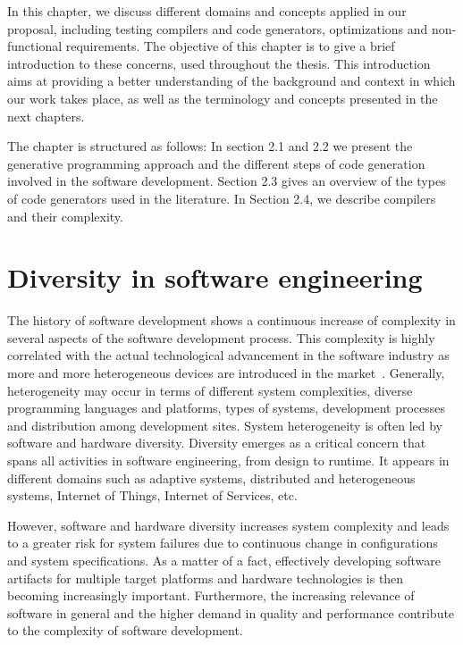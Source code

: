  
In this chapter, we discuss different domains and concepts applied in our proposal, including testing compilers and code generators, optimizations and non-functional requirements.
The objective of this chapter is to give a brief introduction to these concerns, used throughout the thesis. This introduction aims at providing a better understanding of the background and context in which our work takes place, as well as the terminology and concepts presented in the next chapters.

The chapter is structured as follows: In section 2.1 and 2.2 we present the generative programming approach and the different steps of code generation involved in the software development. Section 2.3 gives an overview of the types of code generators used in the literature. In Section 2.4, we describe compilers and their complexity.


\section{Diversity in software engineering}
The history of software development shows a continuous increase of complexity in several aspects of the software development process. This complexity is highly correlated with the actual technological advancement in the software industry as more and more heterogeneous devices are introduced in the market~\cite{betz2011improving}. 
Generally, heterogeneity may occur in terms of different system complexities, diverse programming languages and platforms, types of systems, development processes and distribution among development sites\cite{ghazi2015heterogeneous}.
System heterogeneity is often led by software and hardware diversity.
Diversity emerges as a critical concern that spans all activities in software engineering, from design to runtime\cite{acher2014software}. It appears in different domains such as adaptive systems, distributed and heterogeneous systems, Internet of Things, Internet of Services, etc.

However, software and hardware diversity increases system complexity and leads to a greater risk for system failures due to continuous change in configurations and system specifications.
As a matter of a fact, effectively developing software artifacts for multiple target platforms and hardware technologies is then becoming increasingly important.
Furthermore, the increasing relevance of software in general and the higher demand in quality and performance contribute to the complexity of software development.

